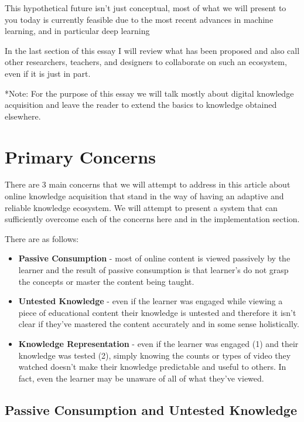 \documentclass{acm_proc_article-sp}
\begin{document}
This hypothetical future isn't just conceptual, most of what we will
present to you today is currently feasible due to the most recent
advances in machine learning, and in particular deep learning

In the last section of this essay I will review what has been proposed
and also call other researchers, teachers, and designers to collaborate
on such an ecosystem, even if it is just in part.

*Note: For the purpose of this essay we will talk mostly about digital
knowledge acquisition and leave the reader to extend the basics to
knowledge obtained elsewhere.

\chapter{Primary Concerns}\label{primary-concerns}

There are 3 main concerns that we will attempt to address in this
article about online knowledge acquisition that stand in the way of
having an adaptive and reliable knowledge ecosystem. We will attempt to
present a system that can sufficiently overcome each of the concerns
here and in the implementation section.

There are as follows:

\begin{itemize}
\item
  \textbf{Passive Consumption} - most of online content is viewed
  passively by the learner and the result of passive consumption is that
  learner's do not grasp the concepts or master the content being
  taught.
\item
  \textbf{Untested Knowledge} - even if the learner was engaged while
  viewing a piece of educational content their knowledge is untested and
  therefore it isn't clear if they've mastered the content accurately
  and in some sense holistically.
\item
  \textbf{Knowledge Representation} - even if the learner was engaged
  (1) and their knowledge was tested (2), simply knowing the counts or
  types of video they watched doesn't make their knowledge predictable
  and useful to others. In fact, even the learner may be unaware of all
  of what they've viewed.
\end{itemize}

\section{Passive Consumption and Untested
Knowledge}\label{passive-consumption-and-untested-knowledge}
\end{document}
